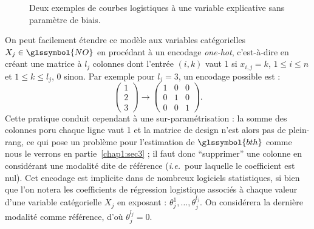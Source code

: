 \begin{figure}
\caption{\label{fig:logit} Deux exemples de courbes logistiques à une variable explicative sans paramètre de biais.}
\end{figure}

On peut facilement étendre ce modèle aux variables catégorielles $X_j \in \glssymbol{NO}$ en procédant à un encodage \textit{one-hot}, c'est-à-dire en créant une matrice à $l_j$ colonnes dont l'entrée $(i,k)$ vaut 1 si $x_{i,j} = k$, $1 \leq i \leq n$ et $1 \leq k \leq l_j$, 0 sinon. Par exemple pour $l_j=3$, un encodage possible est :
$$ \left( \begin{array}{c} 1 \\ 2 \\ 3 \end{array} \right) \to \left( \begin{array}{ccc} 1 & 0 & 0 \\ 0 & 1 & 0 \\ 0 & 0 & 1 \end{array} \right).$$
Cette pratique conduit cependant à une sur-paramétrisation : la somme des colonnes poru chaque ligne vaut 1 et la matrice de design n'est alors pas de plein-rang, ce qui pose un problème pour l'estimation de $\glssymbol{bth}$ comme nous le verrons en partie~\ref{chap1:sec3} ; il faut donc ``supprimer'' une colonne en considérant une modalité dite de référence (\textit{i.e.}\ pour laquelle le coefficient est nul). Cet encodage est implicite dans de nombreux logiciels statistiques, si bien que l'on notera les coefficients de régression logistique associés à chaque valeur d'une variable catégorielle $X_j$ en exposant : $\theta_j^{1},\dots,\theta_j^{l_j}$. On considérera la dernière modalité comme référence, d'où $\theta_j^{l_j} = 0$.

